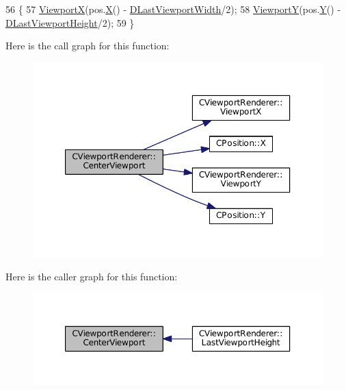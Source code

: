 \begin{DoxyCode}
56                                                           \{
57     \hyperlink{classCViewportRenderer_adf6c09ee00cdbf0803e72d59bff9a235}{ViewportX}(pos.\hyperlink{classCPosition_a9a6b94d3b91df1492d166d9964c865fc}{X}() - \hyperlink{classCViewportRenderer_aaa21acd1b43badc3c1a3b0bf9b0f86f9}{DLastViewportWidth}/2);
58     \hyperlink{classCViewportRenderer_add3d4da286927abe2f19fbb37fd42ed5}{ViewportY}(pos.\hyperlink{classCPosition_a1aa8a30e2f08dda1f797736ba8c13a87}{Y}() - \hyperlink{classCViewportRenderer_aaca5c330615fc2aacc57dede8e7c18b0}{DLastViewportHeight}/2);
59 \}
\end{DoxyCode}
Here is the call graph for this function\+:\nopagebreak
\begin{figure}[H]
\begin{center}
\leavevmode
\includegraphics[width=350pt]{classCViewportRenderer_a12842df851be0f115a735cec994d863e_cgraph}
\end{center}
\end{figure}
Here is the caller graph for this function\+:\nopagebreak
\begin{figure}[H]
\begin{center}
\leavevmode
\includegraphics[width=350pt]{classCViewportRenderer_a12842df851be0f115a735cec994d863e_icgraph}
\end{center}
\end{figure}
\hypertarget{classCViewportRenderer_a2c23b54725686c6219c8765e48351d72}{}\label{classCViewportRenderer_a2c23b54725686c6219c8765e48351d72} 
